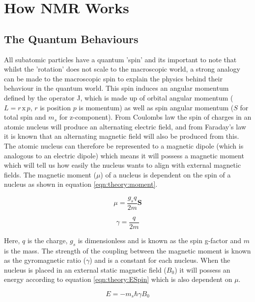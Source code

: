 \documentclass[class=article, crop=false]{standalone}
\begin{document}
 
\label{Chap:Theory}

\section{How NMR Works}
\subsection{The Quantum Behaviours}

All subatomic particles have a quantum 'spin' and its important to note that whilst the 'rotation' does not scale to the macroscopic world, a strong analogy can be made to the macroscopic spin to explain the physics behind their behaviour in the quantum world. This spin induces an angular momentum defined by the operator J, which is made up of orbital angular momentum ($L = r\, \textrm{x} \, p$, $r$ is position $p$ is momentum) as well as spin angular momentum ($S$ for total spin and $m_s$ for z-component). From Coulombs law \cite{Coulomb1785PremierMagnetisme} the spin of charges in an atomic nucleus will produce an alternating electric field, and from Faraday's law \cite{Faraday1821OnMagnetism} it is known that an alternating magnetic field will also be produced from this. The atomic nucleus can therefore be represented to a magnetic dipole (which is analogous to an electric dipole) which means it will possess a magnetic moment which will tell us how easily the nucleus wants to align with external magnetic fields. The magnetic moment ($\mu$) of a nucleus is dependent on the spin of a nucleus as shown in equation \ref{eqn:theory:moment}.

\begin{equation}
    \mu = \frac{g_sq}{2m} \mathbf{S}
    \label{eqn:theory:moment}
\end{equation}

\begin{equation}
    \gamma = \frac{q}{2m}
    \label{eqn:theory:gyro}
\end{equation}

Here, $q$ is the charge, $g_s$ is dimensionless and is known as the spin g-factor and $m$ is the mass. The strength of the coupling between the magnetic moment is known as the gyromagnetic ratio ($\gamma$) and is a constant for each nucleus. When the nucleus is placed in an external static magnetic field ($B_0$) it will possess an energy according to equation \ref{eqn:theory:ESpin} which is also dependent on $\mu$.

\begin{equation}
    E = -m_s\hbar \gamma B_0
    \label{eqn:theory:ESpin}
\end{equation}
\end{document}
